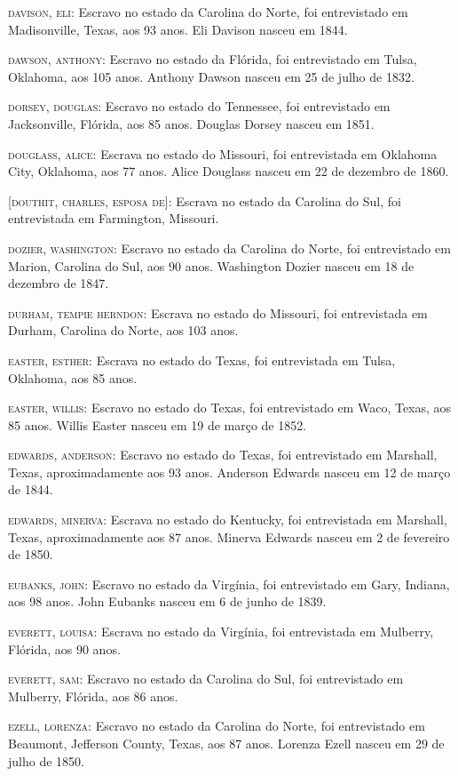 \begin{Parskip}
\textsc{davison, eli:} Escravo no estado da Carolina do Norte, foi
entrevistado em Madisonville, Texas, aos 93 anos. Eli Davison nasceu em
1844.

\textsc{dawson, anthony:} Escravo no estado da Flórida, foi entrevistado
em Tulsa, Oklahoma, aos 105 anos. Anthony Dawson nasceu em 25 de julho
de 1832.

\textsc{dorsey, douglas:} Escravo no estado do Tennessee, foi
entrevistado em Jacksonville, Flórida, aos 85 anos. Douglas Dorsey
nasceu em 1851.

\textsc{douglass, alice:} Escrava no estado do Missouri, foi
entrevistada em Oklahoma City, Oklahoma, aos 77 anos. Alice Douglass
nasceu em 22 de dezembro de 1860.

\textsc{{[}douthit, charles, esposa de{]}:} Escrava no estado da
Carolina do Sul, foi entrevistada em Farmington, Missouri.

\textsc{dozier, washington:} Escravo no estado da Carolina do Norte, foi
entrevistado em Marion, Carolina do Sul, aos 90 anos. Washington Dozier
nasceu em 18 de dezembro de 1847.

\textsc{durham, tempie herndon:} Escrava no estado do Missouri, foi
entrevistada em Durham, Carolina do Norte, aos 103 anos.

\textsc{easter, esther:} Escrava no estado do Texas, foi entrevistada em
Tulsa, Oklahoma, aos 85 anos.

\textsc{easter, willis:} Escravo no estado do Texas, foi entrevistado em
Waco, Texas, aos 85 anos. Willis Easter nasceu em 19 de março de 1852.

\textsc{edwards, anderson:} Escravo no estado do Texas, foi entrevistado
em Marshall, Texas, aproximadamente aos 93 anos. Anderson Edwards nasceu
em 12 de março de 1844.

\textsc{edwards, minerva:} Escrava no estado do Kentucky, foi
entrevistada em Marshall, Texas, aproximadamente aos 87 anos. Minerva
Edwards nasceu em 2 de fevereiro de 1850.

\textsc{eubanks, john:} Escravo no estado da Virgínia, foi entrevistado
em Gary, Indiana, aos 98 anos. John Eubanks nasceu em 6 de junho de
1839.

\textsc{everett, louisa:} Escrava no estado da Virgínia, foi
entrevistada em Mulberry, Flórida, aos 90 anos.

\textsc{everett, sam:} Escravo no estado da Carolina do Sul, foi
entrevistado em Mulberry, Flórida, aos 86 anos.

\textsc{ezell, lorenza:} Escravo no estado da Carolina do Norte, foi
entrevistado em Beaumont, Jefferson County, Texas, aos 87 anos. Lorenza
Ezell nasceu em 29 de julho de 1850.


\end{Parskip}
